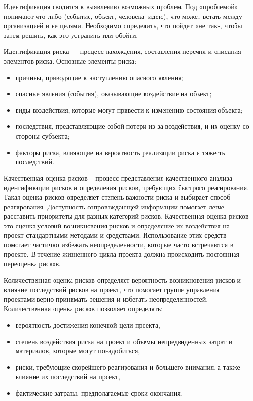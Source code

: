 Идентификация сводится к выявлению возможных проблем. 
Под «проблемой» понимают что-либо (событие, объект, человека, идею), что может встать между организацией и ее целями.
Необходимо определить, что пойдет «не так», чтобы затем решить, как это устранить или обойти.

Идентификация риска --- процесс нахождения, составления перечня и описания элементов риска.
Основные элементы риска:
\begin{itemize}
\item  причины, приводящие к наступлению опасного явления;
\item опасные явления (события), оказывающие воздействие на объект;
\item виды воздействия, которые могут привести к изменению состояния объекта;
\item последствия, представляющие собой потери из-за воздействия, и их оценку со стороны субъекта;
\item факторы риска, влияющие на вероятность реализации риска и тяжесть последствий.
\end{itemize}

Качественная оценка рисков – процесс представления качественного анализа идентификации рисков и определения рисков, требующих быстрого реагирования. Такая оценка рисков определяет степень важности риска и выбирает способ реагирования. Доступность сопровождающей информации помогает легче расставить приоритеты для разных категорий рисков. Качественная оценка рисков это оценка условий возникновения рисков и определение их воздействия на проект стандартными методами и средствами. Использование этих средств помогает частично избежать неопределенности, которые часто встречаются в проекте. В течение жизненного цикла проекта должна происходить
постоянная переоценка рисков.

Количественная оценка рисков определяет вероятность возникновения рисков и влияние последствий рисков на проект, что помогает группе управления проектами верно принимать решения и избегать неопределенностей. Количественная оценка рисков позволяет определять:
\begin{itemize}
\item вероятность достижения конечной цели проекта,
\item степень воздействия риска на проект и объемы непредвиденных затрат и материалов, которые могут понадобиться,
\item риски, требующие скорейшего реагирования и большего внимания, а также влияние их последствий на проект,
\item фактические затраты, предполагаемые сроки окончания.
\end{itemize}

